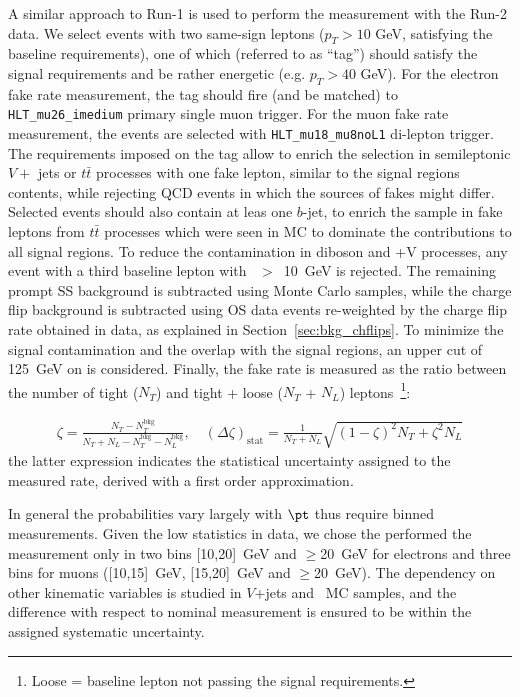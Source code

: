 A similar approach to Run-1 is used to perform the measurement with the Run-2 data. We select events with two same-sign leptons ($p_T>10$ GeV, satisfying the baseline requirements), one of which (referred to as ``tag'') 
should satisfy the signal requirements and be rather energetic (e.g. $p_T>40$ GeV). For the electron fake rate measurement, the tag should fire (and be matched) to \texttt{HLT\_mu26\_imedium} primary single muon trigger. For the muon fake rate measurement, the events are selected with \texttt{HLT\_mu18\_mu8noL1} di-lepton trigger.
The requirements imposed on the tag allow to enrich the selection in semileptonic $V+$ jets or $t\bar t$ processes with one fake lepton, similar to the signal regions contents, while rejecting QCD events in which the sources of fakes might differ. 
Selected events should also contain at leas one $b$-jet, to enrich the sample in fake leptons from $t\bar t$ processes 
which were seen in MC to dominate the contributions to all signal regions. 
To reduce the contamination in diboson and \ttbar+V processes, any event with a third baseline lepton with \pt~$>$~10~GeV is rejected. The remaining prompt SS background is subtracted using Monte Carlo samples, 
while the charge flip background is subtracted using OS data events re-weighted by the charge flip rate obtained in data, as explained in Section~\ref{sec:bkg_chflips}. To minimize the signal contamination and the overlap with the signal regions, an upper cut of 125~GeV on \met is considered. Finally, the fake rate is measured as the ratio between the number of tight ($N_T$) and tight + loose ($N_T$ + $N_L$) leptons~\footnote{Loose = baseline lepton not passing the signal requirements.}:

\begin{align} 
	\zeta = \frac{N_T-N_T^\text{bkg}}{N_T + N_L -N_T^\text{bkg} -N_L^\text{bkg}},
	\quad (\Delta\zeta)_\text{stat} = \frac 1{N_T+N_L}\sqrt{(1-\zeta)^2 N_T + \zeta^2 N_L}
\end{align}
the latter expression indicates the statistical uncertainty assigned to the measured rate, 
derived with a first order approximation. 

In general the probabilities vary largely with $\pt$ thus require binned measurements. Given the low statistics in data, we chose the performed the measurement only in two \pt bins [10,20]~GeV and $\geq$20~GeV for electrons and three \pt bins for muons ([10,15]~GeV, [15,20]~GeV and $\geq$20~GeV). The dependency on other kinematic variables is studied in $V$+jets and \ttbar\ MC samples, and the difference with respect to nominal measurement is ensured to be within the assigned systematic uncertainty. 

